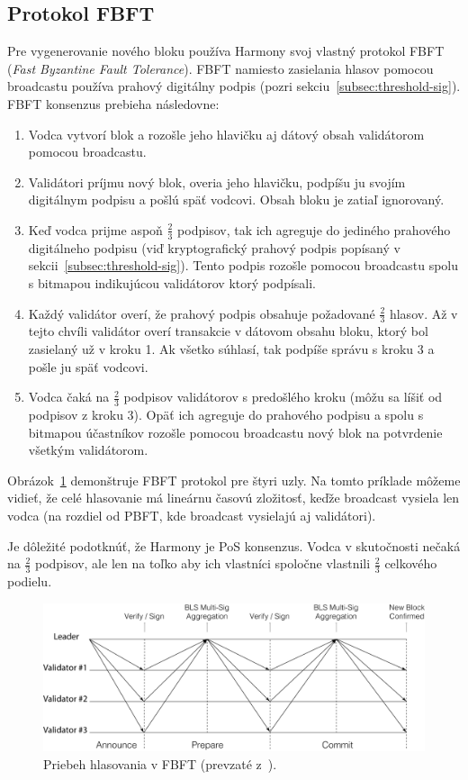\subsection{Protokol FBFT}\label{subsec:fbft}
Pre vygenerovanie nového bloku používa Harmony svoj vlastný protokol FBFT (\textit{Fast Byzantine Fault Tolerance}). FBFT namiesto zasielania hlasov pomocou broadcastu používa prahový digitálny podpis (pozri sekciu~\ref{subsec:threshold-sig}). FBFT konsenzus prebieha následovne:
\begin{enumerate}
	\item Vodca vytvorí blok a rozošle jeho hlavičku aj dátový obsah validátorom pomocou broadcastu.
	\item Validátori príjmu nový blok, overia jeho hlavičku, podpíšu ju svojím digitálnym podpisu a pošlú späť vodcovi. Obsah bloku je zatiaľ ignorovaný.
	\item Keď vodca prijme aspoň $\frac{2}{3}$ podpisov, tak ich agreguje do jediného prahového digitálneho podpisu (viď kryptografický prahový podpis popísaný v sekcii~\ref{subsec:threshold-sig}). Tento podpis rozošle pomocou broadcastu spolu s bitmapou indikujúcou validátorov ktorý podpísali.
	\item Každý validátor overí, že prahový podpis obsahuje požadované $\frac{2}{3}$ hlasov. Až v tejto chvíli validátor overí transakcie v dátovom obsahu bloku, ktorý bol zasielaný už v kroku 1. Ak všetko súhlasí, tak podpíše správu s kroku 3 a pošle ju späť vodcovi.
	\item Vodca čaká na $\frac{2}{3}$ podpisov validátorov s predošlého kroku (môžu sa líšiť od podpisov z kroku 3). Opäť ich agreguje do prahového podpisu a spolu s bitmapou účastníkov rozošle pomocou broadcastu nový blok na potvrdenie všetkým validátorom. 
\end{enumerate}
Obrázok~\ref{img:fbft} demonštruje FBFT protokol pre štyri uzly. Na tomto príklade môžeme vidieť, že celé hlasovanie má lineárnu časovú zložitosť, keďže broadcast vysiela len vodca (na rozdiel od PBFT, kde broadcast vysielajú aj validátori).

Je dôležité podotknúť, že Harmony je PoS konsenzus. Vodca v skutočnosti nečaká na $\frac{2}{3}$ podpisov, ale len na toľko aby ich vlastníci spoločne vlastnili $\frac{2}{3}$ celkového podielu.

\begin{figure}[bt]
	\centering
	\includegraphics[width=.7\textwidth]{obrazky-figures/harmony-fbft}
	\caption{Priebeh hlasovania v FBFT (prevzaté z~\cite{harmonyWp}).}
	\label{img:fbft}
\end{figure}

